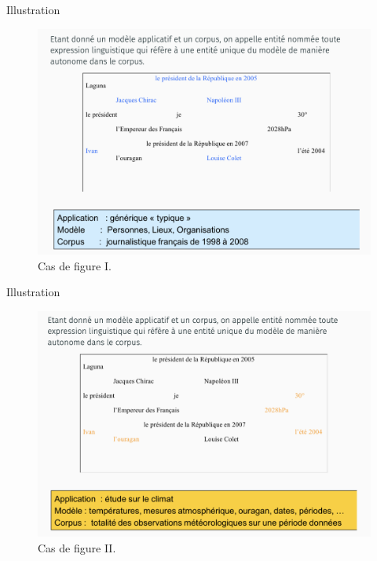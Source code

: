 \documentclass[xetex,xcolor={table,usenames,dvipsnames}]{beamer}
\begin{document}
\begin{frame}{Illustration}
					\begin{figure}[h] %
		\centering
		\includegraphics[width=.9\linewidth]{img/generique.png}
		\caption{Cas de figure \textsc{I}.}
		\label{fig:ling_out_TAL}
	\end{figure}
\end{frame}

\begin{frame}{Illustration}
						\begin{figure}[h] %
		\centering
		\includegraphics[width=.9\linewidth]{img/climat.png}
		\caption{Cas de figure \textsc{II}.}
		\label{fig:ling_out_TAL}
	\end{figure}
\end{frame}
\end{document}
